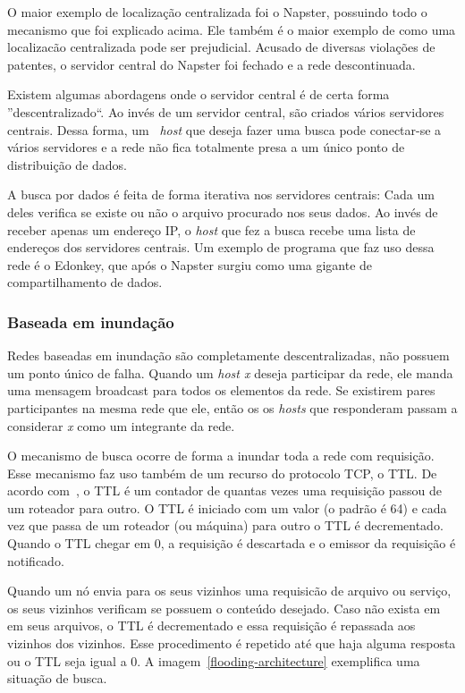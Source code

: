 O maior exemplo de localização centralizada foi o Napster, possuindo todo o mecanismo que foi explicado acima. Ele também é o maior exemplo de como uma localizacão centralizada pode ser prejudicial. Acusado de diversas violações de patentes, o servidor central do Napster foi fechado e a rede descontinuada.

Existem algumas abordagens onde o servidor central é de certa forma ''descentralizado``. Ao invés de um servidor central, são criados vários servidores centrais. Dessa forma, um ~\emph{host} que deseja fazer uma busca pode conectar-se a vários servidores e a rede não fica totalmente presa a um único ponto de distribuição de dados.

A busca por dados é feita de forma iterativa nos servidores centrais: Cada um deles verifica se existe ou não o arquivo procurado nos seus dados. Ao invés de receber apenas um endereço IP, o \emph{host} que fez a busca recebe uma lista de endereços dos servidores centrais.
Um exemplo de programa que faz uso dessa rede é o Edonkey, que após o Napster surgiu como uma gigante de compartilhamento de dados.

\subsubsection{Baseada em inundação}

Redes baseadas em inundação são completamente descentralizadas, não possuem um ponto único de falha. Quando um \emph{host x} deseja participar da rede, ele manda uma mensagem broadcast para todos os elementos da rede. Se existirem pares participantes na mesma rede que ele, então os os \emph{hosts} que responderam passam a considerar \emph{x} como um integrante da rede.

O mecanismo de busca ocorre de forma a inundar toda a rede com requisição. Esse mecanismo faz uso também de um recurso do protocolo TCP, o TTL. De acordo com~\cite{stevens93}, o TTL é um contador de quantas vezes uma requisição passou de um roteador para outro. O TTL é iniciado com um valor (o padrão é 64) e cada vez que passa de um roteador (ou máquina) para outro o TTL é decrementado. Quando o TTL chegar em 0, a requisição é descartada e o emissor da requisição é notificado.

Quando um nó envia para os seus vizinhos uma requisicão de arquivo ou serviço, os seus vizinhos verificam se possuem o conteúdo desejado. Caso não exista em em seus arquivos, o TTL é decrementado e essa requisição é repassada aos vizinhos dos vizinhos. Esse procedimento é repetido até que haja alguma resposta ou o TTL seja igual a 0. A imagem~\ref{flooding-architecture} exemplifica uma situação de busca.

